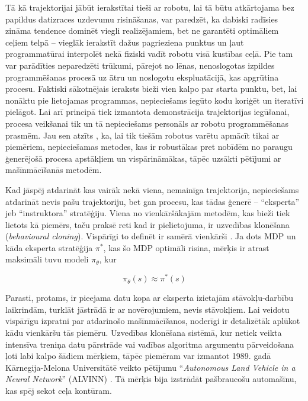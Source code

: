 \documentclass[12pt, a4paper]{article}
\numberwithin{equation}{section} %
\begin{document}
Tā kā trajektorijai jābūt ierakstītai tieši ar robotu, lai tā būtu atkārtojama bez papildus datizraces uzdevumu risināšanas, var paredzēt, ka dabiski radīsies zināma tendence dominēt viegli realizējamiem, bet ne garantēti optimāliem ceļiem telpā -- vieglāk ierakstīt dažus pagrieziena punktus un ļaut programmatūrai interpolēt nekā fiziski vadīt robotu visā kustības ceļā. Pie tam var parādīties neparedzēti trūkumi, pārejot no lēnas, nenoslogotas izpildes programmēšanas procesā uz ātru un noslogotu ekspluatācijā, kas apgrūtina procesu. Faktiski sākotnējais ieraksts bieži vien kalpo par starta punktu, bet, lai nonāktu pie lietojamas programmas, nepieciešams iegūto kodu koriģēt un iteratīvi pielāgot. Lai arī principā tiek izmantota demonstrācija trajektorijas iegūšanai, procesa veikšanai tik un tā nepieciešams personāls ar robotu programmēšanas prasmēm. Jau sen atzīts \cite{muench1994robot,billard2008handbook}, ka, lai tik tiešām robotus varētu apmācīt tikai ar piemēriem, nepieciešamas metodes, kas ir robustākas pret nobīdēm no paraugu ģenerējošā procesa apstākļiem un vispārināmākas, tāpēc uzsākti pētījumi ar mašīnmācīšanās metodēm.

Kad jāspēj atdarināt kas vairāk nekā viena, nemainīga trajektorija, nepieciešams atdarināt nevis pašu trajektoriju, bet gan procesu, kas tādas ģenerē -- ``eksperta'' jeb ``instruktora'' stratēģiju. Viena no vienkāršākajām metodēm, kas bieži tiek lietots kā piemērs, taču praksē reti kad ir pielietojuma, ir uzvedības klonēšana (\textit{behavioural cloning}). Vispārīgi to definēt ir samērā vienkārši \cite{attia2018global}. Ja dots MDP un kāda eksperta stratēģija $\pi^*$, kas šo MDP optimāli risina, mērķis ir atrast maksimāli tuvu modeli $\pi_{\theta}$, kur

\begin{equation}
    \pi_{\theta}(s) \approx \pi^*(s)
\end{equation}

Parasti, protams, ir pieejama datu kopa ar eksperta izietajām stāvokļu-darbību laikrindām, turklāt jāstrādā ir ar novērojumiem, nevis stāvokļiem. Lai veidotu vispārīgu izpratni par atdarinošo mašīnmācīšanos, noderīgi ir detalizētāk aplūkot kādu vienkāršu tās piemēru. Uzvedības klonēšana sistēmā, kur netiek veikta intensīva treniņa datu pārstrāde vai vadības algoritma argumentu pārveidošana ļoti labi kalpo šādiem mērķiem, tāpēc piemēram var izmantot 1989. gadā Kārnegija-Melona Universitātē veikto pētījumu ``\textit{Autonomous Land Vehicle in a Neural Network}'' (ALVINN) \cite{pomerleau1989alvinn}. Tā mērķis bija izstrādāt pašbraucošu automašīnu, kas spēj sekot ceļa kontūram.
\end{document}
